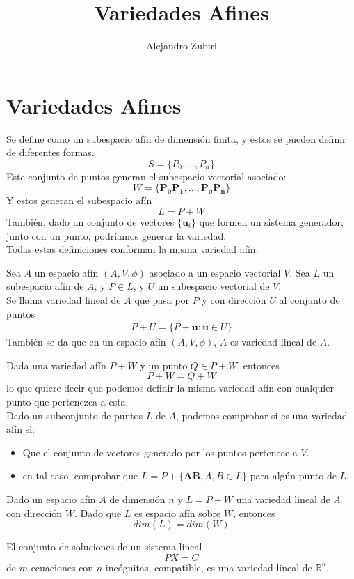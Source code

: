 \documentclass{article}
\author{Alejandro Zubiri}
\title{Variedades Afines}
\begin{document}
\maketitle
\tableofcontents
\pagebreak
\section{Variedades Afines}
Se define como un subespacio afín de dimensión finita, y estos se pueden definir de diferentes formas.
\[
	S= \{ P_0, \dots , P_{n} \}
\]
Este conjunto de puntos generan el subespacio vectorial asociado:
\[
	W=\{ \mathbf{P_0P_1},\dots ,\mathbf{P_0P_{n}} \}
\]
Y estos generan el subespacio afín
\[
	L=P+W
\]
También, dado un conjunto de vectores $\{ \mathbf{u}_{i} \}$  que formen un sistema generador, junto con un punto, podríamos generar la variedad.\\
Todas estas definiciones conforman la misma variedad afín.
\begin{defin}

	Sea $A$ un espacio afín $(A, V, \phi)$ asociado a un espacio vectorial $V$. Sea $L$ un subespacio afín de $A$, y $P \in L$, y $U$ un subespacio vectorial de $V$.\\
	Se llama variedad lineal de $A$ que pasa por $P$ y con dirección $U$ al conjunto de puntos
	\begin{equation}
		\begin{split}
			P+U=\{ P+\mathbf{u}: \mathbf{u} \in U \}
		\end{split}
	\end{equation}
También se da que en un espacio afín $(A,V,\phi)$, $A$ es variedad lineal de $A$.   
\end{defin}
Dada una variedad afín $P+W$ y un punto $Q\in P+W$, entonces
\[
	P+W=Q+W
\]
lo que quiere decir que podemos definir la misma variedad afín con cualquier punto que pertenezca a esta.\\
Dado un subconjunto de puntos $L$ de $A$, podemos comprobar si es una variedad afín si:
\begin{itemize}
	\item Que el conjunto de vectores generado por los puntos pertenece a $V$.
	\item en tal caso, comprobar que $L=P+\{ \mathbf{AB}, A, B \in L \}$ para algún punto de $L$.  
\end{itemize}
\begin{defin}

	Dado un espacio afín $A$ de dimensión $n$ y $L=P+W$ una variedad lineal de $A$ con dirección $W$. Dado que $L$ es espacio afín sobre $W$, entonces
	\[
		dim(L)=dim(W)
	\]

\end{defin}
El conjunto de soluciones de un sistema lineal
\[
	PX=C
\] 
de $m$ ecuaciones con $n$ incógnitas, compatible, es una variedad lineal de $\mathbb{R} ^{n}$.
\end{document}
